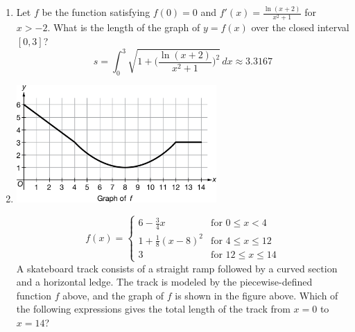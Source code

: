 \documentclass[12pt]{article}
\begin{document}
\begin{enumerate}
        \item Let $f$ be the function satisfying $f(0)=0$ and $f'(x)=\frac{\ln(x+2)}{x^2+1}$ for $x>-2$. What is the length of the graph of $y=f(x)$ over the closed interval $[0,3]$?
$$s=\int_{0}^{3} \sqrt{1 + \biggr(\frac{\ln(x+2)}{x^2+1} \biggr)^2}\, dx \approx \boxed{3.3167}$$
        \item 
        \begin{center}
             \includegraphics[width=3in]{4.041.png}
        \end{center}
\begin{equation*}
f(x) = 
\left\{
    \begin{array}{ll}
        6-\frac{3}{4}x & \text{for } 0 \leq x < 4 \\
        1+\frac{1}{8}(x-8)^2 & \text{for } 4 \leq x \leq 12 \\
       3 & \text{for } 12 \leq x \leq 14
    \end{array}
\right.
\end{equation*}
A skateboard track consists of a straight ramp followed by a curved section and a horizontal ledge. The track is modeled by the piecewise-defined function $f$ above, and the graph of $f$ is shown in the figure above. Which of the following expressions gives the total length of the track from $x=0$ to $x=14$?
\end{enumerate}
\end{document}
